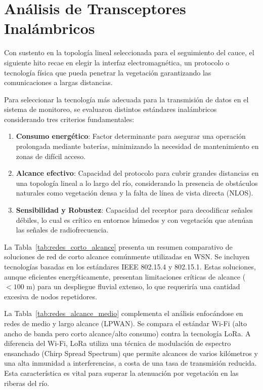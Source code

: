 \section{Análisis de Transceptores Inalámbricos}
\label{sec:analisis_tecnologias}
Con sustento en la topología lineal seleccionada para el seguimiento del cauce, el siguiente hito recae en elegir la interfaz electromagnética, un protocolo o tecnología física que pueda penetrar la vegetación garantizando las comunicaciones a largas distancias.



Para seleccionar la tecnología más adecuada para la transmisión de datos en el sistema de monitoreo, se evaluaron distintos estándares inalámbricos considerando tres criterios fundamentales:

\begin{enumerate}
    \item \textbf{Consumo energético}: Factor determinante para asegurar una operación prolongada mediante baterías, minimizando la necesidad de mantenimiento en zonas de difícil acceso.
    \item \textbf{Alcance efectivo}: Capacidad del protocolo para cubrir grandes distancias en una topología lineal a lo largo del río, considerando la presencia de obstáculos naturales como vegetación densa y la falta de línea de vista directa (NLOS).
    \item \textbf{Sensibilidad y Robustez}: Capacidad del receptor para decodificar señales débiles, lo cual es crítico en entornos húmedos y con vegetación que atenúan las señales de radiofrecuencia.
\end{enumerate}

La Tabla~\ref{tab:redes_corto_alcance} presenta un resumen comparativo de soluciones de red de corto alcance comúnmente utilizadas en WSN. Se incluyen tecnologías basadas en los estándares IEEE 802.15.4 y 802.15.1. Estas soluciones, aunque eficientes energéticamente, presentan limitaciones críticas de alcance ($<100$ m) para un despliegue fluvial extenso, lo que requeriría una cantidad excesiva de nodos repetidores.



La Tabla~\ref{tab:redes_alcance_medio} complementa el análisis enfocándose en redes de medio y largo alcance (LPWAN). Se compara el estándar Wi-Fi (alto ancho de banda pero corto alcance/alto consumo) contra la tecnología LoRa. A diferencia del Wi-Fi, LoRa utiliza una técnica de modulación de espectro ensanchado (Chirp Spread Spectrum) que permite alcances de varios kilómetros y una alta inmunidad a interferencias, a costa de una tasa de transmisión reducida. Esta característica es vital para superar la atenuación por vegetación en las riberas del río.

